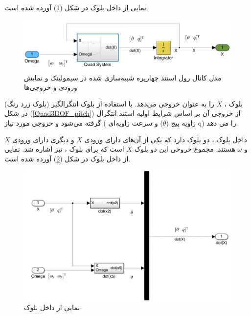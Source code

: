 نمایی از داخل بلوک
در شکل (\ref{Quad1DOF_pitch}) آورده شده است.
\begin{figure}[H]
	\includegraphics[width=16cm]{../../Figures/QuadSimulation/pitch_Integrator.png}
	\centering
	\vspace*{-15mm}
	\caption{مدل کانال رول استند چهارپره شبیه‌سازی شده در سیمولینک و نمایش ورودی و خروجی‌ها}
	\label{Quad1DOF_pitch}
\end{figure}
بلوک
،
$\dot X$ را به عنوان خروجی می‌دهد. با استفاده از بلوک انتگرالگیر (بلوک زرد رنگ) در شکل
(\ref{Quad3DOF_pitch})
از خروجی آن بر اساس شرایط اولیه استند انتگرال گرفته می‌شود و خروجی مورد نیاز ( زاویه پیچ ($\theta$) و سرعت زاویه‌ای‌
q)
را می دهد.

داخل بلوک
،
دو بلوک دارد که یکی از آن‌های دارای ورودی $X$ و دیگری دارای ورودی $X$ و $\omega$ هستند. مجموع خروحی این دو بلوک $\dot X$ است که برای بلوک
،
نیز اشاره شد.
نمایی از داخل بلوک
در شکل (\ref{pitch_all-six}) آورده شده است.
\begin{figure}[H]
	\includegraphics[width=16cm]{../../Figures/QuadSimulation/pitch_all-six.png}
	\centering
	\caption{نمایی از داخل بلوک }
	\label{pitch_all-six}
\end{figure}

